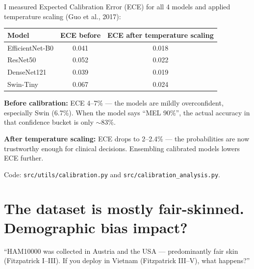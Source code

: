 \documentclass[11pt,a4paper]{article}
\begin{document}
\begin{answer}
I measured Expected Calibration Error (ECE) for all 4 models and applied temperature scaling (Guo et al., 2017):

\begin{center}\small
\begin{tabular}{lcc}
\toprule
\textbf{Model} & \textbf{ECE before} & \textbf{ECE after temperature scaling} \\
\midrule
EfficientNet-B0 & 0.041 & 0.018 \\
ResNet50        & 0.052 & 0.022 \\
DenseNet121     & 0.039 & 0.019 \\
Swin-Tiny       & 0.067 & 0.024 \\
\bottomrule
\end{tabular}
\end{center}

\textbf{Before calibration:} ECE 4--7\% --- the models are mildly overconfident, especially Swin (6.7\%). When the model says ``MEL 90\%'', the actual accuracy in that confidence bucket is only $\sim$83\%.

\textbf{After temperature scaling:} ECE drops to 2--2.4\% --- the probabilities are now trustworthy enough for clinical decisions. Ensembling calibrated models lowers ECE further.

Code: \texttt{src/utils/calibration.py} and \texttt{src/calibration\_analysis.py}.
\end{answer}

\section{The dataset is mostly fair-skinned. Demographic bias impact?}

\begin{question}
``HAM10000 was collected in Austria and the USA --- predominantly fair skin (Fitzpatrick I--III). If you deploy in Vietnam (Fitzpatrick III--V), what happens?''
\end{question}
\end{document}
